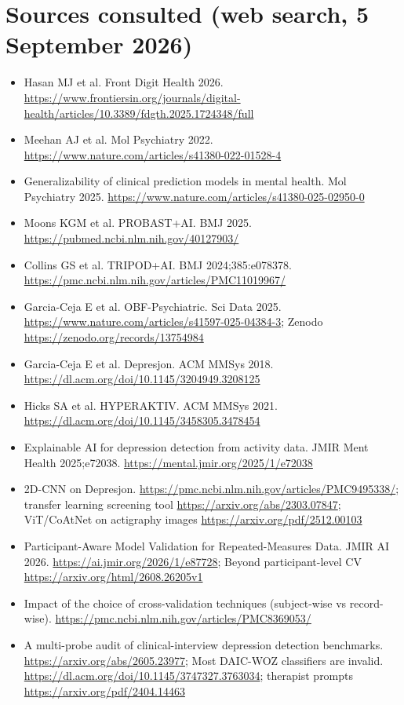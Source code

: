 \documentclass[11pt,a4paper]{article}
\begin{document}
\section*{Sources consulted (web search, 5 September 2026)}
\begin{footnotesize}
\begin{itemize}
\item Hasan MJ et al. Front Digit Health 2026. \url{https://www.frontiersin.org/journals/digital-health/articles/10.3389/fdgth.2025.1724348/full}
\item Meehan AJ et al. Mol Psychiatry 2022. \url{https://www.nature.com/articles/s41380-022-01528-4}
\item Generalizability of clinical prediction models in mental health. Mol Psychiatry 2025. \url{https://www.nature.com/articles/s41380-025-02950-0}
\item Moons KGM et al. PROBAST+AI. BMJ 2025. \url{https://pubmed.ncbi.nlm.nih.gov/40127903/}
\item Collins GS et al. TRIPOD+AI. BMJ 2024;385:e078378. \url{https://pmc.ncbi.nlm.nih.gov/articles/PMC11019967/}
\item Garcia-Ceja E et al. OBF-Psychiatric. Sci Data 2025. \url{https://www.nature.com/articles/s41597-025-04384-3}; Zenodo \url{https://zenodo.org/records/13754984}
\item Garcia-Ceja E et al. Depresjon. ACM MMSys 2018. \url{https://dl.acm.org/doi/10.1145/3204949.3208125}
\item Hicks SA et al. HYPERAKTIV. ACM MMSys 2021. \url{https://dl.acm.org/doi/10.1145/3458305.3478454}
\item Explainable AI for depression detection from activity data. JMIR Ment Health 2025;e72038. \url{https://mental.jmir.org/2025/1/e72038}
\item 2D-CNN on Depresjon. \url{https://pmc.ncbi.nlm.nih.gov/articles/PMC9495338/}; transfer learning screening tool \url{https://arxiv.org/abs/2303.07847}; ViT/CoAtNet on actigraphy images \url{https://arxiv.org/pdf/2512.00103}
\item Participant-Aware Model Validation for Repeated-Measures Data. JMIR AI 2026. \url{https://ai.jmir.org/2026/1/e87728}; Beyond participant-level CV \url{https://arxiv.org/html/2608.26205v1}
\item Impact of the choice of cross-validation techniques (subject-wise vs record-wise). \url{https://pmc.ncbi.nlm.nih.gov/articles/PMC8369053/}
\item A multi-probe audit of clinical-interview depression detection benchmarks. \url{https://arxiv.org/abs/2605.23977}; Most DAIC-WOZ classifiers are invalid. \url{https://dl.acm.org/doi/10.1145/3747327.3763034}; therapist prompts \url{https://arxiv.org/pdf/2404.14463}

\end{itemize}
\end{footnotesize}
\end{document}
